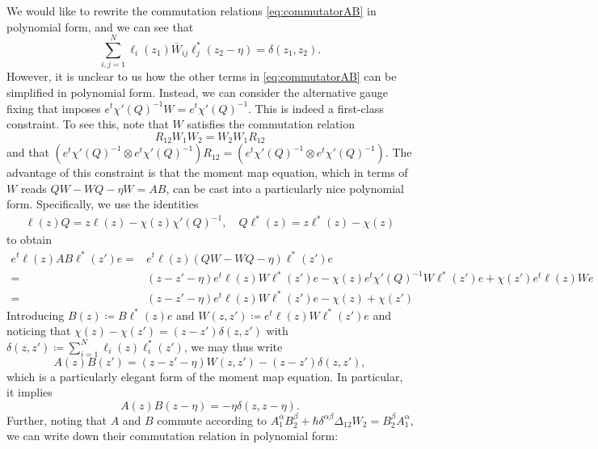 We would like to rewrite the commutation relations \eqref{eq:commutatorAB} in polynomial form, and we can see that
\begin{equation}
\sum_{i,j=1}^N \ell_i(z_1) \bar W_{ij} \ell_j^*(z_2-\eta) = \delta(z_1,z_2).
\end{equation}
However, it is unclear to us how the other terms in \eqref{eq:commutatorAB} can be simplified in polynomial form. Instead, we can consider the alternative gauge fixing that imposes $e^t \chi'(Q)^{-1} W = e^t \chi'(Q)^{-1}$. This is indeed a first-class constraint. To see this, note that $W$ satisfies the commutation relation
\begin{equation}
R_{12} W_1 W_2 = W_2 W_1 R_{12}
\end{equation}
and that $(e^t \chi'(Q)^{-1} \otimes e^t \chi'(Q)^{-1}) R_{12} = (e^t \chi'(Q)^{-1} \otimes e^t \chi'(Q)^{-1})$. The advantage of this constraint is that the moment map equation, which in terms of $W$ reads $QW-WQ-\eta W = AB$, can be cast into a particularly nice polynomial form. Specifically, we use the identities
\begin{align}
\ell(z) Q = z \ell(z) - \chi(z) \chi'(Q)^{-1}, \quad Q \ell^*(z) = z \ell^*(z) - \chi(z)
\end{align}
to obtain
\begin{equation}
\begin{aligned}
e^t \ell(z) AB \ell^*(z') e
={}& e^t \ell(z) (QW-WQ-\eta) \ell^*(z') e \\
={}& (z-z'-\eta) e^t \ell(z) W \ell^*(z') e - \chi(z) e^t \chi'(Q)^{-1} W \ell^*(z') e + \chi(z') e^t \ell(z) W e \\
={}& (z-z'-\eta) e^t \ell(z) W \ell^*(z') e - \chi(z) + \chi(z')
\end{aligned}
\end{equation}
Introducing $B(z) \coloneq B \ell^*(z) e$ and $W(z,z') \coloneq e^t \ell(z) W \ell^*(z') e$ and noticing that $\chi(z) - \chi(z') = (z-z') \delta(z,z')$ with $\delta(z,z') \coloneq \sum_{i=1}^N \ell_i(z) \ell_i^*(z')$, we may thus write
\begin{equation}
A(z) B(z') = (z-z'-\eta) W(z,z') - (z-z') \delta(z,z'),
\end{equation}
which is a particularly elegant form of the moment map equation. In particular, it implies
\begin{equation}
A(z) B(z-\eta) = -\eta \delta(z,z-\eta).
\end{equation}
Further, noting that $A$ and $B$ commute according to $A_1^\alpha B_2^\beta + \hbar \delta^{\alpha\beta} \Delta_{12} W_2 = B_2^\beta A_1^\alpha$, we can write down their commutation relation in polynomial form:
